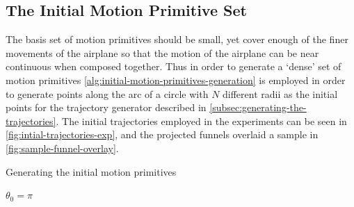 \subsection{The Initial Motion Primitive Set}
\label{subsec:initial-motion-primitive}

The basis set of motion primitives should be small, yet cover enough of the
finer movements of the airplane so that the motion of the airplane can be near
continuous when composed together. Thus in order to generate a `dense' set of
motion primitives \cref{alg:initial-motion-primitives-generation} is employed in
order to generate points along the arc of a circle with \(N\) different radii as
the initial points for the trajectory generator described in
\cref{subsec:generating-the-trajectories}. The initial trajectories employed in
the experiments can be seen in \cref{fig:intial-trajectories-exp}, and the
projected funnels overlaid a sample in \cref{fig:sample-funnel-overlay}.

\begin{algorithm}
  \caption{Generating the initial motion primitives}
  \label{alg:initial-motion-primitives-generation}
  \DontPrintSemicolon \SetAlgoNoLine

   

  \(\theta_{0} = \pi\) \;

  \;
\end{algorithm}

